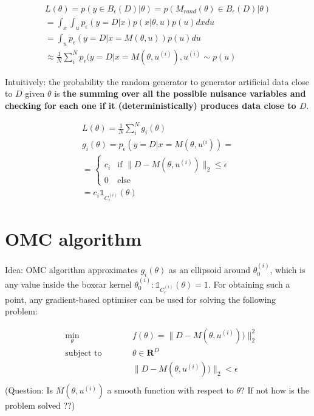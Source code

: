 \documentclass{article}
\newcommand{\norm}[1]{\lVert#1\rVert_2}
\begin{document}
\begin{gather} \label{eq:dual_view}
  L(\theta) = p(y \in B_\epsilon (D)|\theta) = p(M_{rand}(\theta) \in B_\epsilon (D)|\theta)\\
  = \int_x \int_u p_\epsilon(y=D|x)p(x|\theta, u) p(u)dxdu \\
  = \int_u p_\epsilon(y=D|x=M(\theta, u)) p(u)du \\
  \approx \frac{1}{N} \sum_i^N p_\epsilon (y=D|x=M(\theta, u^{(i)}), u^{(i)} \sim p(u)  
\end{gather}

Intuitively: the probability the random generator to generator artificial data close to $D$ given $\theta$ is \textbf{the summing over all the possible nuisance variables and checking for each one if it (deterministically) produces data close to $D$}.


\begin{gather}
  L(\theta) = \frac{1}{N} \sum_{i}^Ng_i(\theta) \\
  g_i(\theta) = p_\epsilon(y=D|x=M(\theta, u^{(i})) = \\ 
= \left\{
	\begin{array}{ll}
		c_i  & \mbox{if } \norm{D-M(\theta, u^{(i)})} \leq \epsilon \\
		0 & \mbox{else } 
	\end{array}
  \right. \\
  = c_i\mathbb{1}_{C_\epsilon^{(i)}}(\theta)
  \end{gather}


\section{OMC algorithm}

Idea: OMC algorithm approximates $g_i(\theta)$ as an ellipsoid around $\theta_0^{(i)}$, which is any value inside the boxcar kernel $\theta_0^{(i)}: \mathbb{1}_{C_\epsilon^{(i)}}(\theta) = 1$. For obtaining such a point, any gradient-based optimiser can be used for solving the following problem:
 
\begin{subequations}
\begin{alignat}{2}
&\!\min_{\theta}        &\qquad& f(\theta) = \norm{D - M(\theta, u^{(i)}))}^2\label{eq:optProb}\\
&\text{subject to} &      & \theta \in \mathbf{R}^D \\
&                  &      & \norm{D - M(\theta, u^{(i)}))} < \epsilon \\
\end{alignat}
\end{subequations}
%
(Question: Is $M(\theta, u^{(i)})$ a smooth function with respect to $\theta$? If not how is the problem solved ??)
\end{document}
